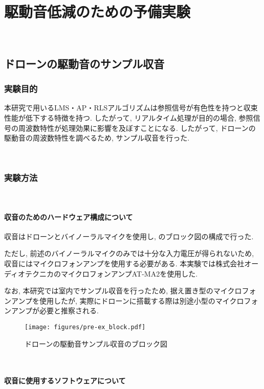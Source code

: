 \
\chapter{駆動音低減のための予備実験}\label{noise-pre-experiment}

\
\section{ドローンの駆動音のサンプル収音}\label{record-drone}

\subsection{実験目的}\label{purpose-drone}

本研究で用いるLMS・AP・RLSアルゴリズムは参照信号が有色性を持つと収束性能が低下する特徴を持つ. したがって, リアルタイム処理が目的の場合, 参照信号の周波数特性が処理効果に影響を及ぼすことになる. したがって, ドローンの駆動音の周波数特性を調べるため, サンプル収音を行った. 

\
\subsection{実験方法}\label{instruction-drone}

\
\subsubsection{収音のためのハードウェア構成について}\label{hardware-for-record}

収音はドローンとバイノーラルマイクを使用し, のブロック図の構成で行った. 

ただし, 前述のバイノーラルマイクのみでは十分な入力電圧が得られないため, 収音にはマイクロフォンアンプを使用する必要がある. 本実験では株式会社オーディオテクニカのマイクロフォンアンプAT-MA2を使用した. 

なお, 本研究では室内でサンプル収音を行ったため, 据え置き型のマイクロフォンアンプを使用したが, 実際にドローンに搭載する際は別途小型のマイクロフォンアンプが必要と推察される. 
\begin{figure}[H]
\centering
\texttt{[image: figures/pre-ex\_block.pdf]}
\caption{ドローンの駆動音サンプル収音のブロック図}
\label{fig:pre-ex_block}
\end{figure}

\
\subsubsection{収音に使用するソフトウェアについて}\label{software-for-record}

